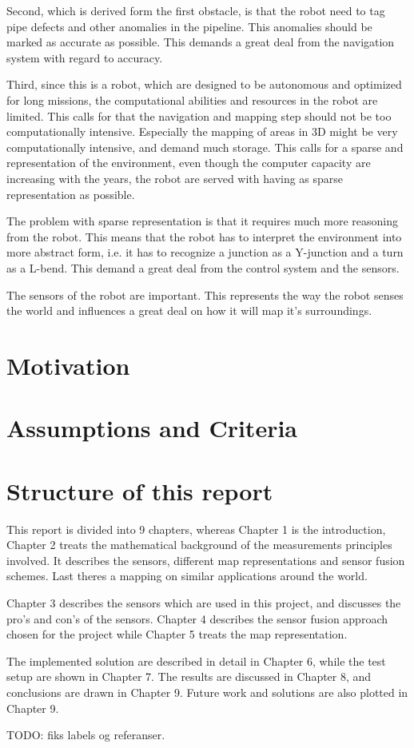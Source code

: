 Second, which is derived form the first obstacle, is that the robot need to tag pipe
defects and other anomalies in the pipeline. This anomalies should be marked as accurate
as possible. This demands a great deal from the navigation system with regard to accuracy. 

Third, since this is a robot, which are designed to be autonomous and optimized for long
missions, the computational abilities and resources in the robot are limited. This calls
for that the navigation and mapping step should not be too computationally intensive.
Especially the mapping of areas in 3D might be very computationally intensive, and demand
much storage. This calls for a sparse and representation of the environment, even though
the computer capacity are increasing with the years, the robot are served with having as
sparse representation as possible. 

The problem with sparse representation is that it requires much more reasoning from the 
robot. This means that the robot has to interpret the environment into more abstract form,
i.e. it has to recognize a junction as a Y-junction and a turn as a L-bend. This demand a
great deal from the control system and the sensors. 

The sensors of the robot are important. This represents the way the robot senses the world
and influences a great deal on how it will map it's surroundings. 


\section{Motivation}


\section{Assumptions and Criteria}


\section{Structure of this report}
This report is divided into 9 chapters, whereas Chapter 1 is the introduction, Chapter 2
treats the mathematical background of the measurements principles involved. It describes
the sensors, different map representations and sensor fusion schemes. Last theres a
mapping on similar applications around the world.

Chapter 3 describes the sensors which are used in this project, and discusses the pro's
and con's of the sensors. Chapter 4 describes the sensor fusion approach chosen for the
project while Chapter 5 treats the map representation. 

The implemented solution are described in detail in Chapter 6, while the test setup are
shown in Chapter 7. The results are discussed in Chapter 8, and conclusions are drawn in
Chapter 9. Future work and solutions are also plotted in Chapter 9.

TODO: fiks labels og referanser. 

